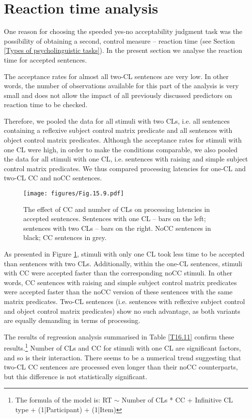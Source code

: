 \section{Reaction time analysis}
\label{Reaction time analysis}

One reason for choosing the speeded yes-no acceptability judgment task was the possibility of obtaining a second, control measure – reaction time (see Section \ref{Types of psycholinguistic tasks}). In the present section we analyse the reaction time for accepted sentences.

The acceptance rates for almost all two-CL sentences are very low. In other words, the number of observations available for this part of the analysis is very small and does not allow the impact of all previously discussed predictors on reaction time to be checked. 

Therefore, we pooled the data for all stimuli with two CLs, i.e. all sentences containing a reflexive subject control matrix predicate and all sentences with object control matrix predicates. Although the acceptance rates for stimuli with one CL were high, in order to make the conditions comparable, we also pooled the data for all stimuli with one CL, i.e. sentences with raising and simple subject control matrix predicates. We thus compared processing latencies for one-CL and two-CL CC and noCC sentences. 

\begin{figure}
\caption{The effect of CC and number of CLs on processing latencies in accepted sentences. Sentences with one CL -- bars on the left; sentences with two CLs -- bars on the right. NoCC sentences in black; CC sentences in grey.}
\label{F16.11}
\texttt{[image: figures/Fig.15.9.pdf]}
\end{figure}

As presented in Figure \ref{F16.11}, stimuli with only one CL took less time to be accepted than sentences with two CLs. Additionally, within the one-CL sentences, stimuli with CC were accepted faster than the corresponding noCC stimuli. In other words, CC sentences with raising and simple subject control matrix predicates were accepted faster than the noCC version of these sentences with the same matrix predicates. Two-CL sentences (i.e. sentences with reflexive subject control and object control matrix predicates) show no such advantage, as both variants are equally demanding in terms of processing.

The results of regression analysis summarised in Table \ref{T16.11} confirm these results.\footnote{The formula of the model is: {RT $\sim$ Number of CLs * CC + Infinitive CL type + (1|Participant) + (1|Item)}} Number of CLs and CC for stimuli with one CL are significant factors, and so is their interaction. There seems to be a numerical trend suggesting that two-CL CC sentences are processed even longer than their noCC counterparts, but this difference is not statistically significant. 


